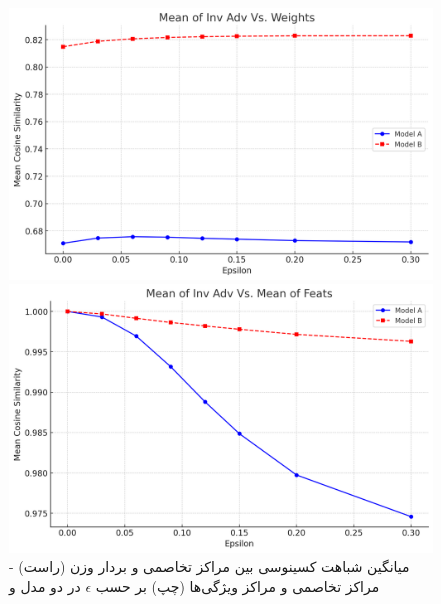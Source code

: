 \documentclass{article}
\begin{document}
\begin{figure}[h]
    \centering
    \begin{minipage}[b]{0.45\textwidth}
        \centering
        \includegraphics[width=\textwidth]{cl-ce-W.png}
    \end{minipage}
    \hfill
    \begin{minipage}[b]{0.45\textwidth}
        \centering
        \includegraphics[width=\textwidth]{cl-ce-M.png}
    \end{minipage}
    \caption{
میانگین شباهت کسینوسی بین مراکز تخاصمی و بردار وزن (راست) - مراکز تخاصمی و مراکز ویژگی‌ها (چپ) بر حسب $\epsilon$    
در دو مدل  و 
    }
    \label{fig:sample-images}
\end{figure}

\end{document}
